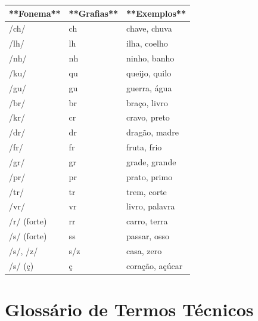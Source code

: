 \begin{center}
\renewcommand{\arraystretch}{1.5}
\begin{tabular}{lll}
\toprule
**Fonema** & **Grafias** & **Exemplos** \\
\midrule

/ch/ & ch & chave, chuva \\

/lh/ & lh & ilha, coelho \\

/nh/ & nh & ninho, banho \\

/ku/ & qu & queijo, quilo \\

/gu/ & gu & guerra, água \\

/br/ & br & braço, livro \\

/kr/ & cr & cravo, preto \\

/dr/ & dr & dragão, madre \\

/fr/ & fr & fruta, frio \\

/gr/ & gr & grade, grande \\

/pr/ & pr & prato, primo \\

/tr/ & tr & trem, corte \\

/vr/ & vr & livro, palavra \\

/r/ (forte) & rr & carro, terra \\

/s/ (forte) & ss & passar, osso \\

/s/, /z/ & s/z & casa, zero \\

/s/ (ç) & ç & coração, açúcar \\

\bottomrule\end{tabular}\end{center}

\chapter{Glossário de Termos Técnicos}

